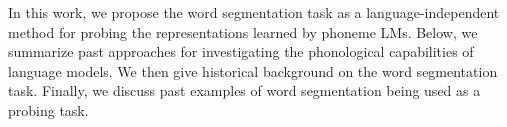 In this work, we propose the word segmentation task as a language-independent method for probing the representations learned by phoneme LMs. Below, we summarize past approaches for investigating the phonological capabilities of language models. We then give historical background on the word segmentation task. Finally, we discuss past examples of word segmentation being used as a probing task.











